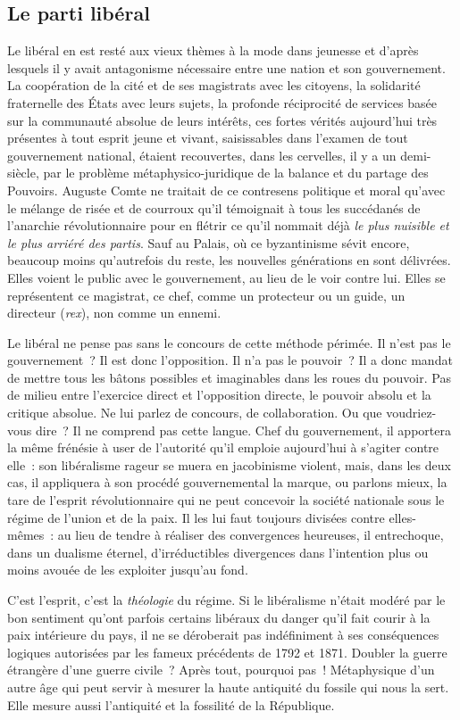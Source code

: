 \documentclass[french,twoside]{book} %
\begin{document}
\subsection[Le parti libéral]{Le parti libéral}
\noindent Le libéral en est resté aux vieux thèmes à la mode dans jeunesse et d’après lesquels il y avait antagonisme nécessaire entre une nation et son gouvernement. La coopération de la cité et de ses magistrats avec les citoyens, la solidarité fraternelle des États avec leurs sujets, la profonde réciprocité de services basée sur la communauté absolue de leurs intérêts, ces fortes vérités aujourd’hui très présentes à tout esprit jeune et vivant, saisissables dans l’examen de tout gouvernement national, étaient recouvertes, dans les cervelles, il y a un demi-siècle, par le problème métaphysico-juridique de la balance et du partage des Pouvoirs. Auguste Comte ne traitait de ce contresens politique et moral qu’avec le mélange de risée et de courroux qu’il témoignait à tous les succédanés de l’anarchie révolutionnaire pour en flétrir ce qu’il nommait déjà \emph{le plus nuisible et le plus arriéré des partis}. Sauf au Palais, où ce byzantinisme sévit encore, beaucoup moins qu’autrefois du reste, les nouvelles générations en sont délivrées. Elles voient le public avec le gouvernement, au lieu de le voir contre lui. Elles se représentent ce magistrat, ce chef, comme un protecteur ou un guide, un directeur (\emph{rex}), non comme un ennemi.\par
Le libéral ne pense pas sans le concours de cette méthode périmée. Il n’est pas le gouvernement ? Il est donc l’opposition. Il n’a pas le pouvoir ? Il a donc mandat de mettre tous les bâtons possibles et imaginables dans les roues du pouvoir. Pas de milieu entre l’exercice direct et l’opposition directe, le pouvoir absolu et la critique absolue. Ne lui parlez de concours, de collaboration. Ou que voudriez-vous dire ? Il ne comprend pas cette langue. Chef du gouvernement, il apportera la même frénésie à user de l’autorité qu’il emploie aujourd’hui à s’agiter contre elle : son libéralisme rageur se muera en jacobinisme violent, mais, dans les deux cas, il appliquera à son procédé gouvernemental la marque, ou parlons mieux, la tare de l’esprit révolutionnaire qui ne peut concevoir la société nationale sous le régime de l’union et de la paix. Il les lui faut toujours divisées contre elles-mêmes : au lieu de tendre à réaliser des convergences heureuses, il entrechoque, dans un dualisme éternel, d’irréductibles divergences dans l’intention plus ou moins avouée de les exploiter jusqu’au fond.\par
C’est l’esprit, c’est la \emph{théologie} du régime. Si le libéralisme n’était modéré par le bon sentiment qu’ont parfois certains libéraux du danger qu’il fait courir à la paix intérieure du pays, il ne se déroberait pas indéfiniment à ses conséquences logiques autorisées par les fameux précédents de 1792 et 1871. Doubler la guerre étrangère d’une guerre civile ? Après tout, pourquoi pas ! Métaphysique d’un autre âge qui peut servir à mesurer la haute antiquité du fossile qui nous la sert. Elle mesure aussi l’antiquité et la fossilité de la République.\par
\end{document}

